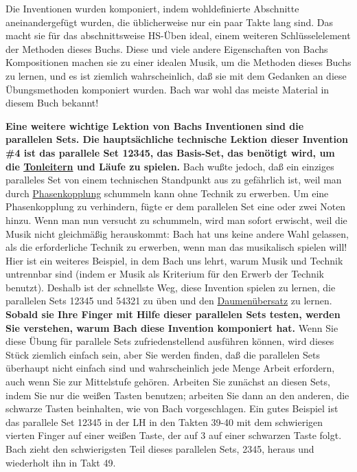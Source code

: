 Die Inventionen wurden komponiert, indem wohldefinierte Abschnitte aneinandergefügt wurden, die üblicherweise nur ein paar Takte lang sind.
Das macht sie für das abschnittsweise HS-Üben ideal, einem weiteren Schlüsselelement der Methoden dieses Buchs.
Diese und viele andere Eigenschaften von Bachs Kompositionen machen sie zu einer idealen Musik, um die Methoden dieses Buchs zu lernen, und es ist ziemlich wahrscheinlich, daß sie mit dem Gedanken an diese Übungsmethoden komponiert wurden.
Bach war wohl das meiste Material in diesem Buch bekannt!

\textbf{Eine weitere wichtige Lektion von Bachs Inventionen sind die parallelen Sets.
Die hauptsächliche technische Lektion dieser Invention \#4 ist das parallele Set 12345, das Basis-Set, das benötigt wird, um die \hyperref[c1iii5]{Tonleitern} und Läufe zu spielen.}
Bach wußte jedoch, daß ein einziges paralleles Set von einem technischen Standpunkt aus zu gefährlich ist, weil man durch \hyperref[c1iii7b2]{Phasenkopplung} schummeln kann ohne Technik zu erwerben.
Um eine Phasenkopplung zu verhindern, fügte er dem parallelen Set eine oder zwei Noten hinzu.
Wenn man nun versucht zu schummeln, wird man sofort erwischt, weil die Musik nicht gleichmäßig herauskommt: Bach hat uns keine andere Wahl gelassen, als die erforderliche Technik zu erwerben, wenn man das musikalisch spielen will!
Hier ist ein weiteres Beispiel, in dem Bach uns lehrt, warum Musik und Technik untrennbar sind (indem er Musik als Kriterium für den Erwerb der Technik benutzt).
Deshalb ist der schnellste Weg, diese Invention spielen zu lernen, die parallelen Sets 12345 und 54321 zu üben und den \hyperref[c1iii5b]{Daumenübersatz} zu lernen.
\textbf{Sobald sie Ihre Finger mit Hilfe dieser parallelen Sets testen, werden Sie verstehen, warum Bach diese Invention komponiert hat.}
Wenn Sie diese Übung für parallele Sets zufriedenstellend ausführen können, wird dieses Stück ziemlich einfach sein, aber Sie werden finden, daß die parallelen Sets überhaupt nicht einfach sind und wahrscheinlich jede Menge Arbeit erfordern, auch wenn Sie zur Mittelstufe gehören.
Arbeiten Sie zunächst an diesen Sets, indem Sie nur die weißen Tasten benutzen; arbeiten Sie dann an den anderen, die schwarze Tasten beinhalten, wie von Bach vorgeschlagen.
Ein gutes Beispiel ist das parallele Set 12345 in der LH in den Takten 39-40 mit dem schwierigen vierten Finger auf einer weißen Taste, der auf 3 auf einer schwarzen Taste folgt.
Bach zieht den schwierigsten Teil dieses parallelen Sets, 2345, heraus und wiederholt ihn in Takt 49.

